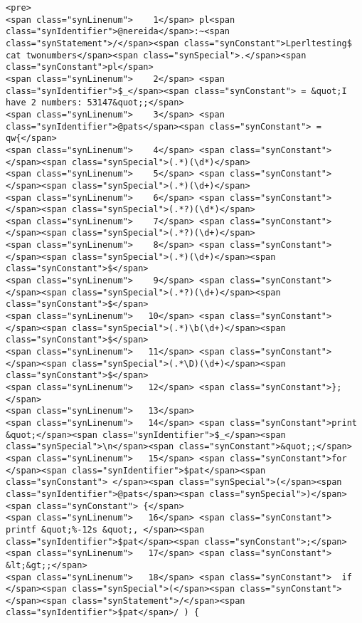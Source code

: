 \begin{exercise}
\begin{itemize}
\begin{verbatim}
<pre>
<span class="synLinenum">    1</span> pl<span class="synIdentifier">@nereida</span>:~<span class="synStatement">/</span><span class="synConstant">Lperltesting$ cat twonumbers</span><span class="synSpecial">.</span><span class="synConstant">pl</span>
<span class="synLinenum">    2</span> <span class="synIdentifier">$_</span><span class="synConstant"> = &quot;I have 2 numbers: 53147&quot;;</span>
<span class="synLinenum">    3</span> <span class="synIdentifier">@pats</span><span class="synConstant"> = qw{</span>
<span class="synLinenum">    4</span> <span class="synConstant">  </span><span class="synSpecial">(.*)(\d*)</span>
<span class="synLinenum">    5</span> <span class="synConstant">  </span><span class="synSpecial">(.*)(\d+)</span>
<span class="synLinenum">    6</span> <span class="synConstant">  </span><span class="synSpecial">(.*?)(\d*)</span>
<span class="synLinenum">    7</span> <span class="synConstant">  </span><span class="synSpecial">(.*?)(\d+)</span>
<span class="synLinenum">    8</span> <span class="synConstant">  </span><span class="synSpecial">(.*)(\d+)</span><span class="synConstant">$</span>
<span class="synLinenum">    9</span> <span class="synConstant">  </span><span class="synSpecial">(.*?)(\d+)</span><span class="synConstant">$</span>
<span class="synLinenum">   10</span> <span class="synConstant">  </span><span class="synSpecial">(.*)\b(\d+)</span><span class="synConstant">$</span>
<span class="synLinenum">   11</span> <span class="synConstant">  </span><span class="synSpecial">(.*\D)(\d+)</span><span class="synConstant">$</span>
<span class="synLinenum">   12</span> <span class="synConstant">};</span>
<span class="synLinenum">   13</span> 
<span class="synLinenum">   14</span> <span class="synConstant">print &quot;</span><span class="synIdentifier">$_</span><span class="synSpecial">\n</span><span class="synConstant">&quot;;</span>
<span class="synLinenum">   15</span> <span class="synConstant">for </span><span class="synIdentifier">$pat</span><span class="synConstant"> </span><span class="synSpecial">(</span><span class="synIdentifier">@pats</span><span class="synSpecial">)</span><span class="synConstant"> {</span>
<span class="synLinenum">   16</span> <span class="synConstant">  printf &quot;%-12s &quot;, </span><span class="synIdentifier">$pat</span><span class="synConstant">;</span>
<span class="synLinenum">   17</span> <span class="synConstant">  &lt;&gt;;</span>
<span class="synLinenum">   18</span> <span class="synConstant">  if </span><span class="synSpecial">(</span><span class="synConstant"> </span><span class="synStatement">/</span><span class="synIdentifier">$pat</span>/ ) {

\end{verbatim}
\end{itemize}
\end{exercise}
